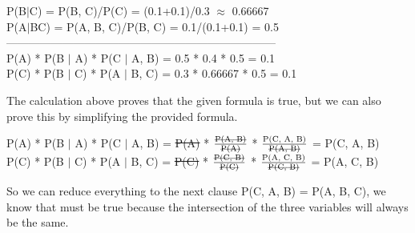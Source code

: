 \documentclass{article}
\begin{document}
\begin{enumerate}[label=(\alph*)]
{\begin{center}
            P(B$|$C) = P(B, C)/P(C) = (0.1+0.1)/0.3 $\approx$ 0.66667 \\
            P(A$|$BC) = P(A, B, C)/P(B, C) = 0.1/(0.1+0.1) = 0.5 \\
            ------------------------------------------------------------------------ \\
            P(A) * P(B $|$ A) * P(C $|$ A, B) = 0.5 * 0.4 * 0.5 = 0.1 \\
            P(C) * P(B $|$ C) * P(A $|$ B, C) = 0.3 * 0.66667 * 0.5 = 0.1 \\
        \end{center}
        The calculation above proves that the given formula is true, but we can also prove this by 
        simplifying the provided formula.
        \begin{center}
            P(A) * P(B $|$ A) * P(C $|$ A, B) = \st{P(A)} * $\frac{\text{\st{P(A, B)}}}{\text{\st{P(A)}}}$ * $\frac{\text{P(C, A, B)}}{\text{\st{P(A, B)}}}$ = P(C, A, B) \\
            P(C) * P(B $|$ C) * P(A $|$ B, C) = \st{P(C)} * $\frac{\text{\st{P(C, B)}}}{\text{\st{P(C)}}}$ * $\frac{\text{P(A, C, B)}}{\text{\st{P(C, B)}}}$ = P(A, C, B) \\
        \end{center}
        So we can reduce everything to the next clause P(C, A, B) = P(A, B, C), we know that must be true 
        because the intersection of the three variables will always be the same.
    }
\end{enumerate}

\clearpage
\end{document}
